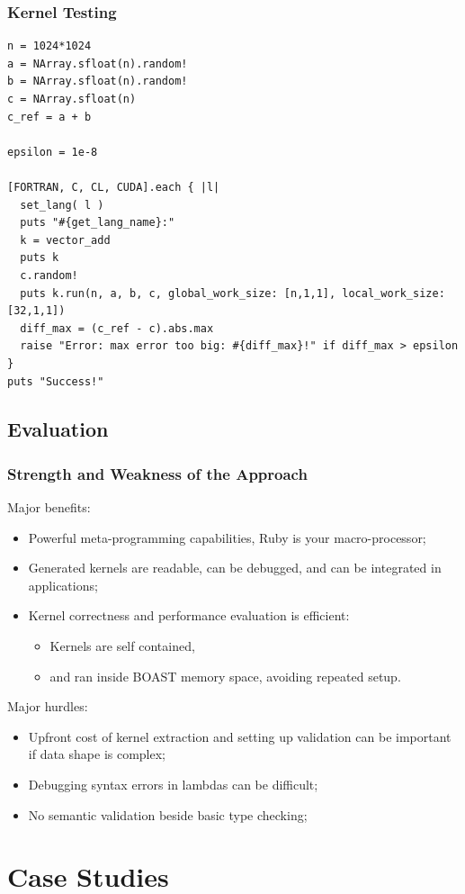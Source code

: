 \documentclass{beamer}
\begin{document}
\begin{frame}[fragile]
\frametitle{Kernel Testing}
\lstset{style=BOAST}
\begin{lstlisting}
n = 1024*1024
a = NArray.sfloat(n).random!
b = NArray.sfloat(n).random!
c = NArray.sfloat(n)
c_ref = a + b

epsilon = 1e-8

[FORTRAN, C, CL, CUDA].each { |l|
  set_lang( l )
  puts "#{get_lang_name}:"
  k = vector_add
  puts k
  c.random!
  puts k.run(n, a, b, c, global_work_size: [n,1,1], local_work_size: [32,1,1])
  diff_max = (c_ref - c).abs.max
  raise "Error: max error too big: #{diff_max}!" if diff_max > epsilon
}
puts "Success!"
\end{lstlisting}
\end{frame}


\subsection{Evaluation}

\begin{frame}
\frametitle{Strength and Weakness of the Approach}
Major benefits:
\begin{itemize}
\item Powerful meta-programming capabilities, Ruby is your macro-processor;
\item Generated kernels are readable, can be debugged, and can be integrated in applications;
\item Kernel correctness and performance evaluation is efficient:
  \begin{itemize}
  \item Kernels are self contained,
  \item and ran inside BOAST memory space, avoiding repeated setup.
  \end{itemize}
\end{itemize}
Major hurdles:
\begin{itemize}
\item Upfront cost of kernel extraction and setting up validation can be important if data shape is complex;
\item Debugging syntax errors in lambdas can be difficult;
\item No semantic validation beside basic type checking;
\end{itemize}

\end{frame}

\section{Case Studies}
\end{document}
